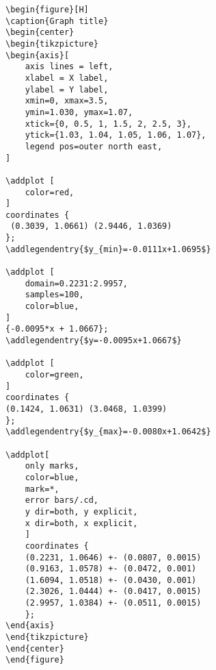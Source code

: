 \begin{verbatim}
\begin{figure}[H]
\caption{Graph title}
\begin{center}
\begin{tikzpicture}
\begin{axis}[
    axis lines = left,
    xlabel = X label,
    ylabel = Y label,
    xmin=0, xmax=3.5,
    ymin=1.030, ymax=1.07,
    xtick={0, 0.5, 1, 1.5, 2, 2.5, 3},
    ytick={1.03, 1.04, 1.05, 1.06, 1.07},
    legend pos=outer north east,
]

\addplot [
    color=red,
]
coordinates {
 (0.3039, 1.0661) (2.9446, 1.0369)
};
\addlegendentry{$y_{min}=-0.0111x+1.0695$}

\addplot [
    domain=0.2231:2.9957, 
    samples=100, 
    color=blue,
]
{-0.0095*x + 1.0667};
\addlegendentry{$y=-0.0095x+1.0667$}

\addplot [
    color=green,
]
coordinates {
(0.1424, 1.0631) (3.0468, 1.0399)
};
\addlegendentry{$y_{max}=-0.0080x+1.0642$}
 
\addplot[
    only marks,
    color=blue,
    mark=*,
    error bars/.cd,
    y dir=both, y explicit,
    x dir=both, x explicit,
    ]
    coordinates {
    (0.2231, 1.0646) +- (0.0807, 0.0015)
    (0.9163, 1.0578) +- (0.0472, 0.001)
    (1.6094, 1.0518) +- (0.0430, 0.001)
    (2.3026, 1.0444) +- (0.0417, 0.0015)
    (2.9957, 1.0384) +- (0.0511, 0.0015)
    };
\end{axis}
\end{tikzpicture}
\end{center}
\end{figure}
\end{verbatim}

